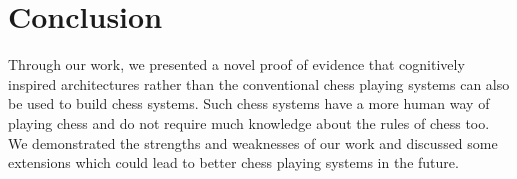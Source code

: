 \section{Conclusion}
Through our work, we presented a novel proof of evidence that cognitively 
inspired architectures rather than the conventional chess playing systems can 
also be used to build chess systems. Such chess systems have a more human way 
of playing chess and do not require much knowledge about the rules of chess 
too. We demonstrated the strengths and weaknesses of our work and discussed 
some extensions which could lead to better chess playing systems in the future.
